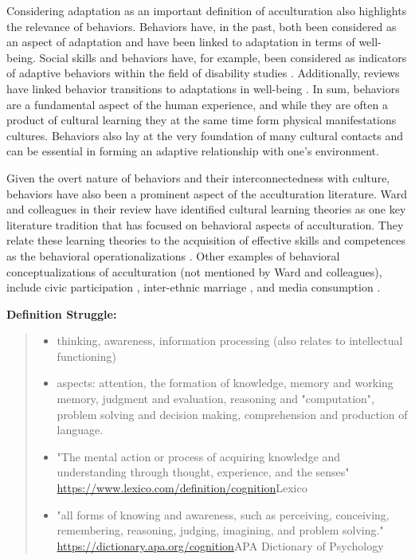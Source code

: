 \documentclass[nobib]{tufte-handout}
\begin{document}
Considering adaptation as an important definition of acculturation also highlights the relevance of behaviors. Behaviors have, in the past, both been considered as an aspect of adaptation and have been linked to adaptation in terms of well-being. Social skills and behaviors have, for example, been considered as indicators of adaptive behaviors within the field of disability studies \citep[e.g.,][]{HyoJungLee2007}. Additionally, reviews have linked behavior transitions to adaptations in well-being \citep[e.g.,][]{Luhmann2012}. 
In sum, behaviors are a fundamental aspect of the human experience, and while they are often a product of cultural learning they at the same time form physical manifestations cultures. Behaviors also lay at the very foundation of many cultural contacts and can be essential in forming an adaptive relationship with one's environment.

Given the overt nature of behaviors and their interconnectedness with culture, behaviors have also been a prominent aspect of the acculturation literature. Ward and colleagues \citeyear{Ward2019} in their review have identified cultural learning theories as one key literature tradition that has focused on behavioral aspects of acculturation. They relate these learning theories to the acquisition of effective skills and competences as the behavioral operationalizations \citep[including, verbal and non-verbal communication skills][]{Ward2001}. Other examples of behavioral conceptualizations of acculturation (not mentioned by Ward and colleagues), include civic participation \citep[e.g., voting;][]{Lessard-Phillips2020}, inter-ethnic marriage \citep[e.g.,][]{Song2009}, and media consumption \citep[e.g.,][]{Shoemaker1985}. 

\begin{framed}
    \textbf{Definition Struggle:}\\ 
    \begin{quote}
        \begin{itemize}
            \item thinking, awareness, information processing (also relates to intellectual functioning)
            \item aspects: attention, the formation of knowledge, memory and working memory, judgment and evaluation, reasoning and "computation", problem solving and decision making, comprehension and production of language.
            \item "The mental action or process of acquiring knowledge and understanding through thought, experience, and the senses" \url{https://www.lexico.com/definition/cognition}{Lexico}
            \item "all forms of knowing and awareness, such as perceiving, conceiving, remembering, reasoning, judging, imagining, and problem solving." \url{https://dictionary.apa.org/cognition}{APA Dictionary of Psychology}
        \end{itemize}
    \end{quote}
\end{framed}
\end{document}
